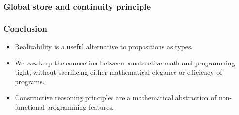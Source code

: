 \documentclass[t]{beamer}
\begin{document}
\begin{frame}[fragile]
  \frametitle{Global store and continuity principle}



\end{frame}


\begin{frame}
  \frametitle{Conclusion}

  \begin{itemize}
  \item Realizability is a useful alternative to propositions as
    types.
  \item We \emph{can} keep the connection between constructive math
    and programming tight, without sacrificing either mathematical
    elegance or efficiency of programs.
  \item Constructive reasoning principles are a mathematical
    abstraction of non-functional programming features.
  \end{itemize}

\end{frame}
\end{document}
